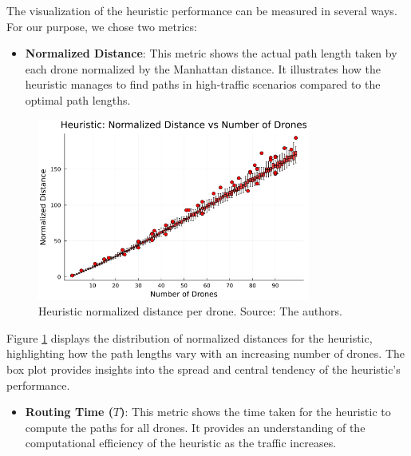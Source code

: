 The visualization of the heuristic performance can be measured in several ways. For our purpose, we chose two metrics:

\begin{itemize}
    \item \textbf{Normalized Distance}: This metric shows the actual path length taken by each drone normalized by the Manhattan distance. It illustrates how the heuristic manages to find paths in high-traffic scenarios compared to the optimal path lengths.
\end{itemize}

\begin{figure}[H]
    \centering
    \includegraphics[width=0.8\textwidth]{img/cpp_normalized_distance_boxplot_vs_drones.png}
    \caption{Heuristic normalized distance per drone. Source: The authors.}
    \label{fig:heuristic_normalized_dist}
\end{figure}

Figure \ref{fig:heuristic_normalized_dist} displays the distribution of normalized distances for the heuristic, highlighting how the path lengths vary with an increasing number of drones. The box plot provides insights into the spread and central tendency of the heuristic's performance.

\begin{itemize}
    \item \textbf{Routing Time ($T$)}: This metric shows the time taken for the heuristic to compute the paths for all drones. It provides an understanding of the computational efficiency of the heuristic as the traffic increases.
\end{itemize}

